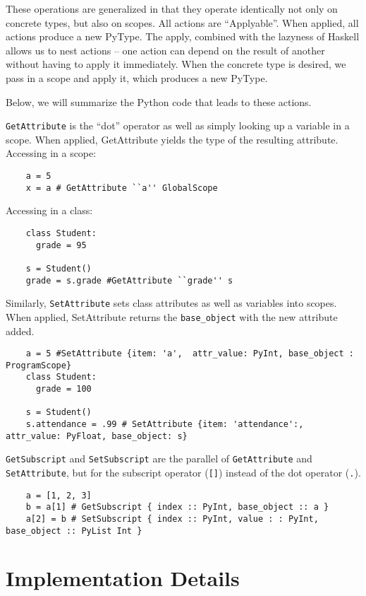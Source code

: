 \documentclass{article}[12pt]
\begin{document}
These operations are generalized in that they operate identically not only on concrete types, but
also on scopes. All actions are ``Applyable''. When applied, all actions produce a new PyType. The apply, combined with
the lazyness of Haskell allows us to nest actions -- one action can depend on the result of another
without having to apply it immediately. When the
concrete type is desired, we pass in a scope and apply it, which
produces a new PyType.

Below, we will summarize the Python code that leads to these actions.

\verb=GetAttribute= is the ``dot'' operator as well as simply looking up a variable in a scope. When
applied, GetAttribute yields the type of the resulting attribute.
Accessing in a scope:
\begin{verbatim}
    a = 5
    x = a # GetAttribute ``a'' GlobalScope
\end{verbatim}

Accessing in a class:
\begin{verbatim}
    class Student:
      grade = 95

    s = Student()
    grade = s.grade #GetAttribute ``grade'' s
\end{verbatim}

Similarly, \verb=SetAttribute= sets class attributes as well as variables into scopes. When applied,
SetAttribute returns the \verb=base_object= with the new attribute added.

\begin{verbatim}
    a = 5 #SetAttribute {item: 'a',  attr_value: PyInt, base_object : ProgramScope}
    class Student:
      grade = 100

    s = Student()
    s.attendance = .99 # SetAttribute {item: 'attendance':, attr_value: PyFloat, base_object: s}
\end{verbatim}

\verb=GetSubscript= and \verb=SetSubscript= are the parallel of \verb=GetAttribute= and
\verb=SetAttribute=, but for the subscript operator (\verb=[]=) instead of the dot operator
(\verb=.=).

\begin{verbatim}
    a = [1, 2, 3]
    b = a[1] # GetSubscript { index :: PyInt, base_object :: a }
    a[2] = b # SetSubscript { index :: PyInt, value : : PyInt, base_object :: PyList Int }
\end{verbatim}

\section{Implementation Details}
\end{document}
